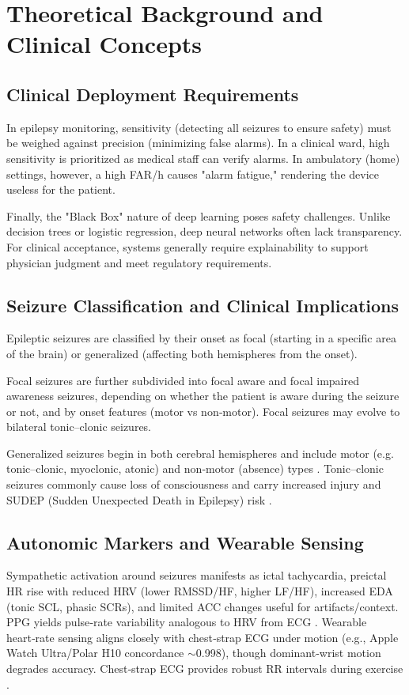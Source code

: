 \section{Theoretical Background and Clinical Concepts}

\subsection{Clinical Deployment Requirements}
In epilepsy monitoring, sensitivity (detecting all
seizures to ensure safety) must be weighed against precision
(minimizing false alarms). In a clinical ward, high sensitivity is
prioritized as medical staff can verify alarms. In ambulatory (home)
settings, however, a high FAR/h causes "alarm
fatigue," rendering the device useless for the patient.

Finally, the "Black Box" nature of deep learning poses safety
challenges. Unlike decision trees or logistic regression, deep neural networks
often lack transparency. For clinical acceptance, systems generally
require explainability to support physician judgment and meet regulatory requirements.

\subsection{Seizure Classification and Clinical Implications}

Epileptic seizures are classified by their onset as focal (starting in a specific area of the brain)
or generalized (affecting both hemispheres from the onset).

Focal seizures are further subdivided into focal aware and focal impaired awareness seizures,
depending on whether the patient is aware during the seizure or not, and by onset features (motor vs non‑motor).
Focal seizures may evolve to bilateral tonic–clonic seizures.

Generalized seizures begin in both cerebral hemispheres and include motor
(e.g. tonic–clonic, myoclonic, atonic) and non‑motor (absence) types
\parencite{fisherInstructionManualILAE2017}. 
Tonic–clonic seizures commonly cause loss of consciousness and carry increased
injury and SUDEP (Sudden Unexpected Death in Epilepsy) risk \parencite{hesdorfferCombinedAnalysisRisk2011}.

\subsection{Autonomic Markers and Wearable Sensing}
Sympathetic activation around seizures manifests as ictal tachycardia,
preictal HR rise with reduced HRV (lower RMSSD/HF, higher LF/HF),
increased EDA (tonic SCL, phasic SCRs), and limited ACC changes
useful for artifacts/context. 
PPG yields pulse‑rate variability analogous to HRV from ECG
\parencite{mironAutonomicBiosignalsSeizure2025,masonHeartRateVariability2024}. 
Wearable heart‑rate sensing aligns closely with chest‑strap ECG under motion (e.g., Apple Watch
Ultra/Polar H10 concordance $\sim$0.998), though dominant‑wrist
motion degrades accuracy. Chest‑strap ECG provides robust RR intervals
during exercise \parencite{wolfHearttoWearAssessingAccuracy2024a}.

